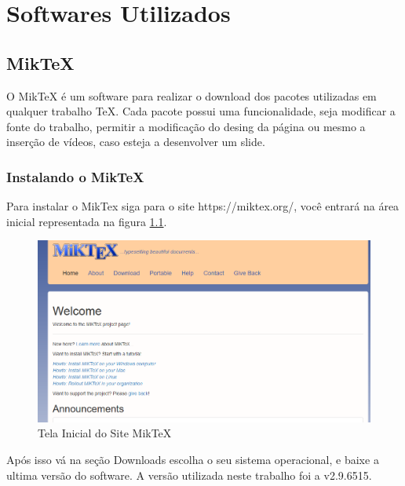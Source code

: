 
\chapter{Softwares Utilizados}

\section{MikTeX}
O MikTeX é um software para realizar o download dos pacotes utilizadas em qualquer trabalho \TeX. Cada pacote possui uma funcionalidade, seja modificar a fonte do trabalho, permitir a modificação do desing da página ou mesmo a inserção de vídeos, caso esteja a desenvolver um slide.
\subsection{Instalando o MikTeX}
Para instalar o MikTex siga para o site https://miktex.org/, você entrará na área inicial representada na figura \ref{fig_Cap1_siteMikTex}.

\begin{figure}[htb]			
	
	\caption{Tela Inicial do Site MikTeX \label{fig_Cap1_siteMikTex}}
	\begin{center}
		\includegraphics[scale=0.4]{./Imagens/capitulo_1/siteMikTeX.png}
	\end{center}
\end{figure}

Após isso vá na seção Downloads escolha o seu sistema operacional, e baixe a ultima versão do software. A versão utilizada neste trabalho foi a v2.9.6515. 

\newpage

